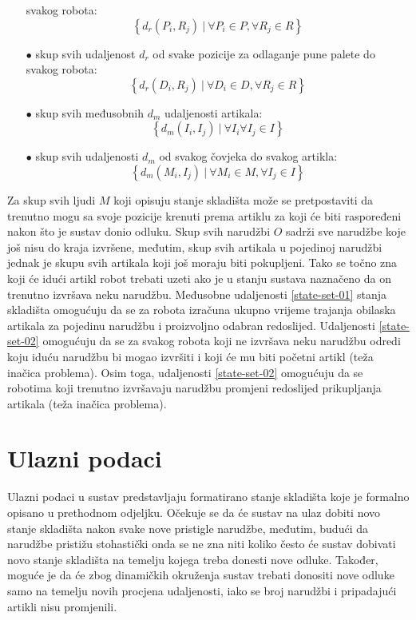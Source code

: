 \documentclass[times, utf8, seminar]{fer}
\begin{document}
\begin{itemize}
                     svakog robota:
                \begin{equation}
                    \left\{d_r(P_i, R_j)\ |\ \forall P_i \in P, \forall R_j \in R\right\}
                \end{equation}
    \item[$\bullet$] skup svih udaljenost $d_r$ od svake pozicije za odlaganje pune palete do
                     svakog robota:
                \begin{equation}
                    \left\{d_r(D_i, R_j)\ |\ \forall D_i \in D, \forall R_j \in R\right\}
                \end{equation}
    \item[$\bullet$] skup svih međusobnih $d_m$ udaljenosti artikala:
                \begin{equation}
                    \left\{d_m(I_i, I_j)\ |\ \forall I_i \forall I_j \in I\right\}
                \end{equation}
    \item[$\bullet$] skup svih udaljenosti $d_m$ od svakog čovjeka do svakog artikla:
                \begin{equation}
                    \left\{d_m(M_i, I_j)\ |\ \forall M_i \in M, \forall I_j \in I\right\}
                \end{equation}
\end{itemize}

Za skup svih ljudi $M$ koji opisuju stanje skladišta može se pretpostaviti da trenutno mogu
sa svoje pozicije krenuti prema artiklu za koji će biti raspoređeni nakon što je sustav
donio odluku. Skup svih narudžbi $O$ sadrži sve narudžbe koje još nisu do kraja izvršene,
međutim, skup svih artikala u pojedinoj narudžbi jednak je skupu svih artikala
koji još moraju biti pokupljeni. Tako se točno zna koji će idući artikl robot trebati
uzeti ako je u stanju sustava naznačeno da on trenutno izvršava neku narudžbu. Međusobne
udaljenosti \ref{state-set-01} stanja skladišta omogućuju da se za robota izračuna ukupno vrijeme
trajanja obilaska artikala za pojedinu narudžbu i proizvoljno odabran redoslijed. Udaljenosti
\ref{state-set-02} omogućuju da se za svakog robota koji ne izvršava neku narudžbu odredi
koju iduću narudžbu bi mogao izvršiti i koji će mu biti početni artikl (teža inačica problema).
Osim toga, udaljenosti \ref{state-set-02} omogućuju da se robotima koji trenutno izvršavaju
narudžbu promjeni redoslijed prikupljanja artikala (teža inačica problema).

\section{Ulazni podaci}
Ulazni podaci u sustav predstavljaju formatirano stanje skladišta koje je formalno opisano u prethodnom odjeljku.
Očekuje se da će sustav na ulaz dobiti novo stanje skladišta nakon svake nove pristigle narudžbe, međutim,
budući da narudžbe pristižu stohastički onda se ne zna niti koliko često će sustav dobivati
novo stanje skladišta na temelju kojega treba donesti nove odluke. Također, moguće je da će zbog
dinamičkih okruženja sustav trebati donositi nove odluke samo na temelju novih procjena udaljenosti, iako
se broj narudžbi i pripadajući artikli nisu promjenili.
\end{document}
